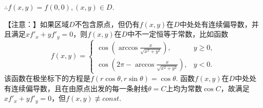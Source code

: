 \documentclass[12pt,UTF8]{ctexart}
\begin{document}
\begin{enumerate}
$\therefore f(x,y)=f(0,0),(x,y)\in D$.
%
%
%
%
%
%
%
%
%

【注意：】如果区域$D$不包含原点，但仍有$f(x,y)$在$D$中处处有连续偏导数，并且满足$xf'_x+yf'_y=0$，则$f(x,y)$在$D$中不一定恒等于常数，比如函数
\[f(x,y)=
\begin{cases}
\cos(\arccos\frac x{\sqrt{x^2+y^2}}),&y\geqslant0,\\
\cos(2\pi-\arccos\frac x{\sqrt{x^2+y^2}}),&y<0.
\end{cases}\]
该函数在极坐标下的方程是$f(r\cos\theta,r\sin\theta)=\cos\theta$. 函数$f(x,y)$在$D$中处处有连续偏导数，且在由原点出发的每一条射线$\theta=C$上均为常数$\cos C$，故满足$xf'_x+yf'_y=0$，但$f(x,y)\not\equiv const$. 


\end{enumerate}
\end{document}
